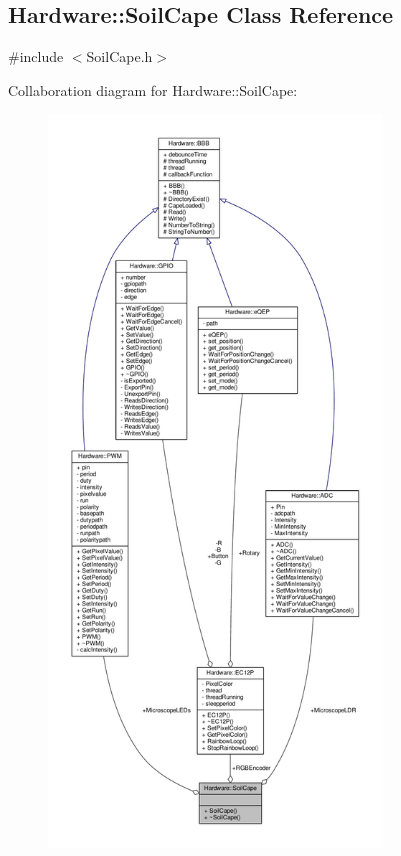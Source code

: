 \hypertarget{class_hardware_1_1_soil_cape}{}\subsection{Hardware\+:\+:Soil\+Cape Class Reference}
\label{class_hardware_1_1_soil_cape}


{\ttfamily \#include $<$Soil\+Cape.\+h$>$}



Collaboration diagram for Hardware\+:\+:Soil\+Cape\+:
\nopagebreak
\begin{figure}[H]
\begin{center}
\leavevmode
\includegraphics[height=550pt]{class_hardware_1_1_soil_cape__coll__graph}
\end{center}
\end{figure}
